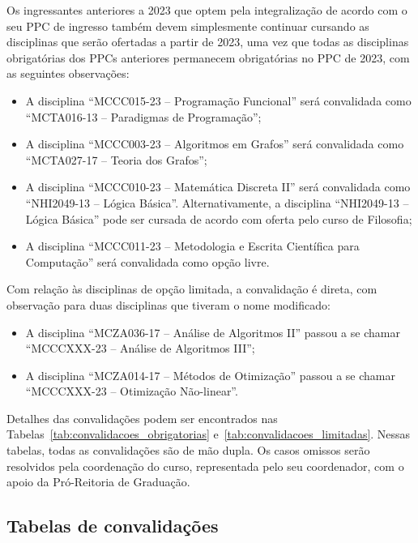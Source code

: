 \documentclass[a4paper]{article}
\begin{document}
Os ingressantes anteriores a 2023 que optem pela integralização de acordo com o
seu PPC de ingresso também devem simplesmente continuar cursando as disciplinas
que serão ofertadas a partir de 2023, uma vez que todas as disciplinas
obrigatórias dos PPCs anteriores permanecem obrigatórias no PPC de 2023, com as
seguintes observações:
\begin{itemize}
    \item A disciplina ``MCCC015-23 -- Programação Funcional'' será convalidada
    como ``MCTA016-13 -- Paradigmas de Programação'';
    \item A disciplina ``MCCC003-23 -- Algoritmos em Grafos'' será convalidada
    como ``MCTA027-17 -- Teoria dos Grafos'';
    \item A disciplina ``MCCC010-23 -- Matemática Discreta II'' será
    convalidada como ``NHI2049-13 -- Lógica Básica''.  Alternativamente, a
    disciplina ``NHI2049-13 -- Lógica Básica'' pode ser cursada de acordo com
    oferta pelo curso de Filosofia;
    \item A disciplina ``MCCC011-23 -- Metodologia e Escrita Científica para
    Computação'' será convalidada como opção livre.
\end{itemize}
Com relação às disciplinas de opção limitada, a convalidação é direta, com
observação para duas disciplinas que tiveram o nome modificado:
\begin{itemize}
    \item A disciplina ``MCZA036-17 -- Análise de Algoritmos II'' passou a se
    chamar ``MCCCXXX-23 -- Análise de Algoritmos III'';
    \item A disciplina ``MCZA014-17 -- Métodos de Otimização'' passou a se
    chamar ``MCCCXXX-23 -- Otimização Não-linear''.
\end{itemize}

Detalhes das convalidações podem ser encontrados nas
Tabelas~\ref{tab:convalidacoes_obrigatorias}
e~\ref{tab:convalidacoes_limitadas}. Nessas tabelas, todas as
convalidações são de mão dupla.
Os casos omissos serão resolvidos pela coordenação do curso, representada pelo
seu coordenador, com o apoio da Pró-Reitoria de Graduação.


\newpage

\subsection{Tabelas de convalidações}
\label{subsec:convalidacoes}
\end{document}

